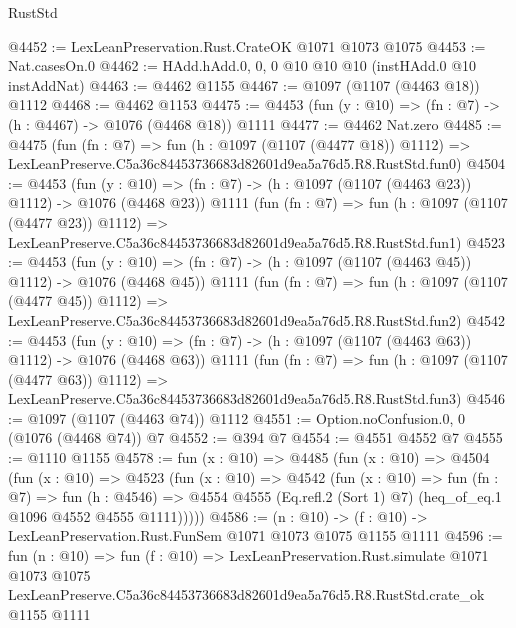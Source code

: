\begin{lexlean}{RustStd}
\begin{coremodule}
@4452 := LexLeanPreservation.Rust.CrateOK @1071 @1073 @1075
@4453 := Nat.casesOn.{0}
@4462 := HAdd.hAdd.{0, 0, 0} @10 @10 @10 (instHAdd.{0} @10 instAddNat)
@4463 := @4462 @1155
@4467 := @1097 (@1107 (@4463 @18)) @1112
@4468 := @4462 @1153
@4475 := @4453 (fun (y : @10) => (fn : @7) -> (h : @4467) -> @1076 (@4468 @18)) @1111
@4477 := @4462 Nat.zero
@4485 := @4475
    (fun (fn : @7) =>
    fun (h : @1097 (@1107 (@4477 @18)) @1112) =>
    LexLeanPreserve.C5a36c84453736683d82601d9ea5a76d5.R8.RustStd.fun0)
@4504 := @4453
    (fun (y : @10) => (fn : @7) -> (h : @1097 (@1107 (@4463 @23)) @1112) -> @1076 (@4468 @23))
    @1111
    (fun (fn : @7) =>
    fun (h : @1097 (@1107 (@4477 @23)) @1112) =>
    LexLeanPreserve.C5a36c84453736683d82601d9ea5a76d5.R8.RustStd.fun1)
@4523 := @4453
    (fun (y : @10) => (fn : @7) -> (h : @1097 (@1107 (@4463 @45)) @1112) -> @1076 (@4468 @45))
    @1111
    (fun (fn : @7) =>
    fun (h : @1097 (@1107 (@4477 @45)) @1112) =>
    LexLeanPreserve.C5a36c84453736683d82601d9ea5a76d5.R8.RustStd.fun2)
@4542 := @4453
    (fun (y : @10) => (fn : @7) -> (h : @1097 (@1107 (@4463 @63)) @1112) -> @1076 (@4468 @63))
    @1111
    (fun (fn : @7) =>
    fun (h : @1097 (@1107 (@4477 @63)) @1112) =>
    LexLeanPreserve.C5a36c84453736683d82601d9ea5a76d5.R8.RustStd.fun3)
@4546 := @1097 (@1107 (@4463 @74)) @1112
@4551 := Option.noConfusion.{0, 0} (@1076 (@4468 @74)) @7
@4552 := @394 @7
@4554 := @4551 @4552 @7
@4555 := @1110 @1155
@4578 := fun (x : @10) =>
  @4485
    (fun (x : @10) =>
    @4504
      (fun (x : @10) =>
      @4523
        (fun (x : @10) =>
        @4542
          (fun (x : @10) =>
          fun (fn : @7) =>
          fun (h : @4546) =>
          @4554 @4555 (Eq.refl.{2} (Sort 1) @7) (heq_of_eq.{1} @1096 @4552 @4555 @1111)))))
@4586 := (n : @10) -> (f : @10) -> LexLeanPreservation.Rust.FunSem @1071 @1073 @1075 @1155 @1111
@4596 := fun (n : @10) =>
  fun (f : @10) =>
  LexLeanPreservation.Rust.simulate
    @1071
    @1073
    @1075
    LexLeanPreserve.C5a36c84453736683d82601d9ea5a76d5.R8.RustStd.crate_ok
    @1155
    @1111
\end{coremodule}
\end{lexlean}
